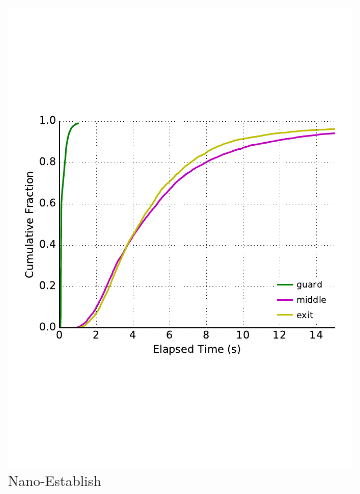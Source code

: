 \begin{figure} \centering
	\begin{subfigure}[t]{0.32\textwidth} \centering
\includegraphics[trim={0 3cm 0 3cm}, clip, width=1.0\textwidth]{images/payment_establish.pdf}
		\caption{Nano-Establish}
\label{fig:payments_establish}
	\end{subfigure}
	\begin{subfigure}[t]{0.32\textwidth} \centering

\end{subfigure}
\end{figure}
